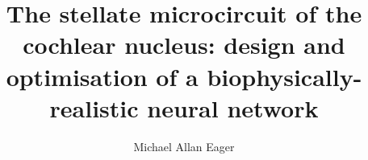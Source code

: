 
\title{%
The stellate microcircuit of the cochlear nucleus: design and optimisation of a biophysically-realistic neural network}

\author{Michael Allan Eager}





